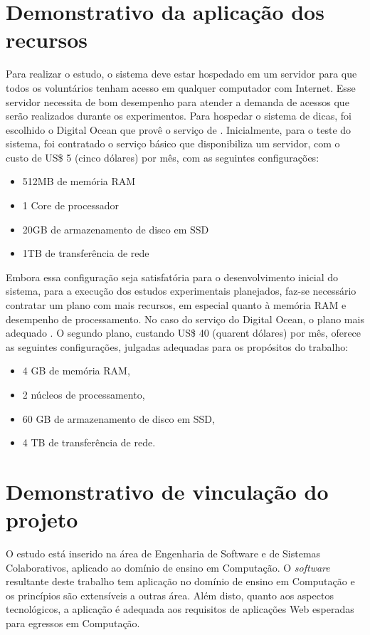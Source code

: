 \chapter{Demonstrativo da aplicação dos recursos}

Para realizar o estudo, o sistema deve estar hospedado em um servidor para que todos os voluntários tenham acesso em qualquer computador com Internet. Esse servidor necessita de bom desempenho para atender a demanda de acessos que serão realizados durante os experimentos. Para hospedar o sistema de dicas, foi escolhido o Digital Ocean que provê o serviço de . Inicialmente, para o teste do sistema, foi contratado o serviço básico que disponibiliza um servidor, com o custo de US\$ 5 (cinco dólares) por mês, com as seguintes configurações:

\begin{itemize}
	\item 512MB de memória RAM
	\item 1 Core de processador
	\item 20GB de armazenamento de disco em SSD
	\item 1TB de transferência de rede
\end{itemize}

Embora essa configuração seja satisfatória para o desenvolvimento inicial do sistema, para a execução
dos estudos experimentais planejados, faz-se necessário contratar um plano com mais recursos, em
especial quanto à memória RAM e desempenho de processamento. No caso do serviço do Digital Ocean, o
plano mais adequado . O segundo plano, custando US\$ 40 (quarent dólares) por mês, oferece as seguintes configurações, julgadas adequadas para os propósitos do trabalho:

\begin{itemize}
	\item 4 GB de memória RAM,
	\item 2 núcleos de processamento,
	\item 60 GB de armazenamento de disco em SSD,
	\item 4 TB de transferência de rede.
\end{itemize}





\chapter{Demonstrativo de vinculação do projeto}

O estudo está inserido na área de Engenharia de Software e de Sistemas Colaborativos,
aplicado ao domínio de ensino em Computação. O \textit{software} resultante deste 
trabalho tem aplicação no domínio de ensino em Computação e os princípios são
extensíveis a outras área. Além disto, quanto aos aspectos tecnológicos, a aplicação
é adequada aos requisitos de aplicações Web esperadas para egressos em Computação.